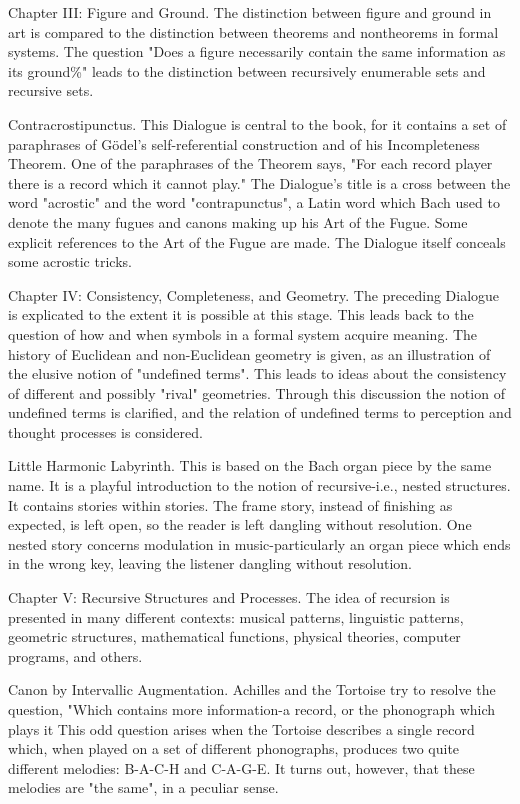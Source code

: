 Chapter III: Figure and Ground. The distinction between figure and ground in art is compared to
  the distinction between theorems and nontheorems in formal systems. The question "Does a
  figure necessarily contain the same information as its ground\%" leads to the distinction between
  recursively enumerable sets and recursive sets.

Contracrostipunctus. This Dialogue is central to the book, for it contains a set of paraphrases of
  Gödel’s self-referential construction and of his Incompleteness Theorem. One of the paraphrases
  of the Theorem says, "For each record player there is a record which it cannot play." The
  Dialogue's title is a cross between the word "acrostic" and the word "contrapunctus", a Latin word
  which Bach used to denote the many fugues and canons making up his Art of the Fugue. Some
  explicit references to the Art of the Fugue are made. The Dialogue itself conceals some acrostic
  tricks.

Chapter IV: Consistency, Completeness, and Geometry. The preceding Dialogue is explicated to
  the extent it is possible at this stage. This leads back to the question of how and when symbols in
  a formal system acquire meaning. The history of Euclidean and non-Euclidean geometry is given,
  as an illustration of the elusive notion of "undefined terms". This leads to ideas about the
  consistency of different and possibly "rival" geometries. Through this discussion the notion of
  undefined terms is clarified, and the relation of undefined terms to perception and thought
  processes is considered.

Little Harmonic Labyrinth. This is based on the Bach organ piece by the same name. It is a playful
    introduction to the notion of recursive-i.e., nested structures. It contains stories within stories. The
    frame story, instead of finishing as expected, is left open, so the reader is left dangling without
    resolution. One nested story concerns modulation in music-particularly an organ piece which
    ends in the wrong key, leaving the listener dangling without resolution.

Chapter V: Recursive Structures and Processes. The idea of recursion is presented in many
  different contexts: musical patterns, linguistic patterns, geometric structures, mathematical
  functions, physical theories, computer programs, and others.

Canon by Intervallic Augmentation. Achilles and the Tortoise try to resolve the question, "Which
  contains more information-a record, or the phonograph which plays it This odd question arises
  when the Tortoise describes a single record which, when played on a set of different
  phonographs, produces two quite different melodies: B-A-C-H and C-A-G-E. It turns out,
  however, that these melodies are "the same", in a peculiar sense.

